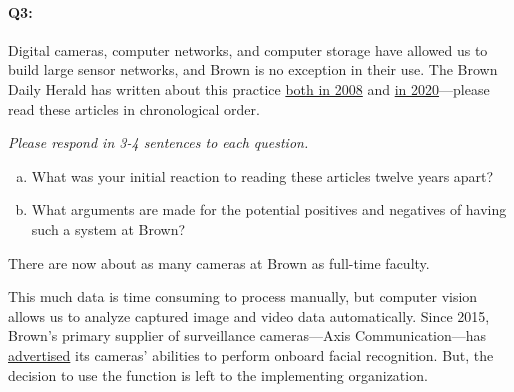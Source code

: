 \pagebreak
\paragraph{Q3:}
Digital cameras, computer networks, and computer storage have allowed us to build large sensor networks, and Brown is no exception in their use. The Brown Daily Herald has written about this practice \href{https://www.browndailyherald.com/2008/01/10/surveillance-cameras-on-campus-triple/}{both in 2008} and \href{https://www.browndailyherald.com/2020/02/21/cameras-installed-hegeman-hall/}{in 2020}---please read these articles in chronological order.

\emph{Please respond in 3-4 sentences to each question.}

\begin{enumerate}[(a)]
    \item What was your initial reaction to reading these articles twelve years apart?
    \item What arguments are made for the potential positives and negatives of having such a system at Brown?
\end{enumerate}

There are now about as many cameras at Brown as full-time faculty.

%
% 


This much data is time consuming to process manually, but computer vision allows us to analyze captured image and video data automatically.
Since 2015, Brown’s primary supplier of surveillance cameras---Axis Communication---has \href{https://www.axis.com/customer-story/3767}{advertised} its cameras’ abilities to perform onboard facial recognition. But, the decision to use the function is left to the implementing organization.


